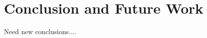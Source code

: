\section{Conclusion and Future Work}
\label{sec:conclusion-future-work}

{\color{red} Need new conclusions....}

